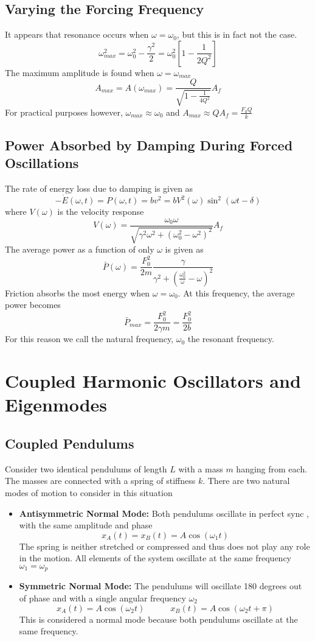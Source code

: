 \documentclass[11pt]{article}
\begin{document}
\subsection{Varying the Forcing Frequency}
It appears that resonance occurs when $\omega = \omega_0$, but this is in fact not the case. 
$$ \omega^2_{max} = \omega_0^2 - \frac{\gamma^2}{2} = \omega_0^2\left[1 - \frac{1}{2Q^2}\right]$$
The maximum amplitude is found when $\omega=\omega_{max}$
$$ A_{max} = A(\omega_{max}) = \frac{Q}{\sqrt{1 - \frac{1}{4Q^2}}} A_f $$
For practical purposes however, $\omega_{max} \approx \omega_0$ and $A_{max} \approx QA_f = \frac{F_0Q}{k}$

\subsection{Power Absorbed by Damping During Forced Oscillations}
The rate of energy loss due to damping is given as $$ - \dot{E} (\omega, t) = P (\omega, t) = bv^2 = bV^2(\omega)\sin^2(\omega t - \delta)$$ where $V(\omega)$ is the velocity response $$ V(\omega) = \frac{\omega_0\omega}{\sqrt{\gamma^2 \omega^2 + (\omega_0^2-\omega^2)^2}} A_f$$
The average power as a function of only $\omega$ is given as 
$$ \bar{P} (\omega) = \frac{F_0^2}{2m} \frac{\gamma}{\gamma^2+ (\frac{\omega_0^2}{\omega} - \omega)^2}$$
Friction absorbs the most energy when $\omega = \omega_0$. At this frequency, the average power becomes 
$$ \bar{P}_{max}  = \frac{F_0^2}{2\gamma m} =  \frac{F_0^2}{2b} $$ For this reason we call the natural frequency, $\omega_0$ the resonant frequency.
\pagebreak
\section{Coupled Harmonic Oscillators and Eigenmodes}
\subsection{Coupled Pendulums}
Consider two identical pendulums of length $L$ with a mass $m$ hanging from each. The masses are connected with a spring of stiffness $k$. There are two natural modes of motion to consider in this situation
\begin{itemize}
\item \textbf{Antisymmetric Normal Mode:}  Both pendulums oscillate in perfect sync , with the same amplitude and phase
$$ x_A(t) = x_B(t) = A \cos(\omega_1 t)$$
The spring is neither stretched or compressed and thus does not play any role in the motion. All elements of the system oscillate at the same frequency $\omega_1 = \omega_p$
\item \textbf{Symmetric Normal Mode:} The pendulums will oscillate 180 degrees out of phase and with a single angular frequency $\omega_2$
$$ x_A(t) = A \cos (\omega_2 t) \quad \quad \quad x_B(t) = A \cos (\omega_2 t + \pi)$$
This is considered a normal mode because both pendulums oscillate at the same frequency.
\end{itemize}
\end{document}
